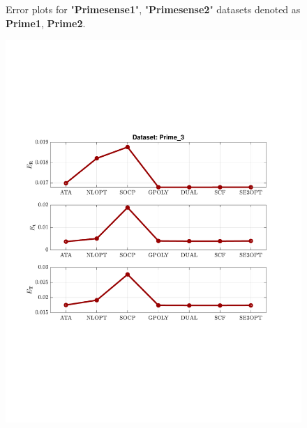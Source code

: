 \documentclass[a4paper]{report}
\begin{document}
\begin{figure}
\caption{Error plots for "\textbf{Primesense{\textunderscore}1}", "\textbf{Primesense{\textunderscore}2}" datasets denoted as \textbf{Prime{\textunderscore}1}, \textbf{Prime{\textunderscore}2}.}
\end{figure}

\begin{figure}
\centering
\includegraphics[scale=0.7]{./hand_eye_figures/real/adv_Result_Prime_3}

\end{figure}
\end{document}
